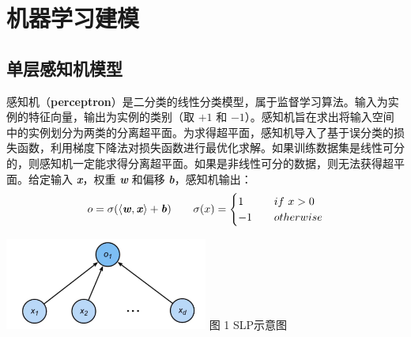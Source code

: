 \section{机器学习建模}

    \subsection{单层感知机模型}
        \par 感知机（\textbf{perceptron}）是二分类的线性分类模型，属于监督学习算法。输入为实例的特征向量，输出为实例的类别（取 $+1$ 和 $-1$）。感知机旨在求出将输入空间中的实例划分为两类的分离超平面。为求得超平面，感知机导入了基于误分类的损失函数，利用梯度下降法对损失函数进行最优化求解。如果训练数据集是线性可分的，则感知机一定能求得分离超平面。如果是非线性可分的数据，则无法获得超平面。给定输入 \textbf{\textit{x}}，权重 \textbf{\textit{w}} 和偏移 \textbf{\textit{b}}，感知机输出：
        $$o = \sigma(\langle \textbf{\textit{w}}, \textbf{\textit{x}} \rangle + \textbf{\textit{b}}) \qquad \sigma(x) = \begin{cases}
            1 \quad &if \ x > 0 \\ -1 \quad &otherwise
        \end{cases}$$
        \begin{minipage}{\linewidth}
            \begin{center}
                \includegraphics*[width = 0.5\textwidth]{SLP.jpg}
                {\small 图 1 SLP示意图}
            \end{center}
        \end{minipage}
        \vfill
